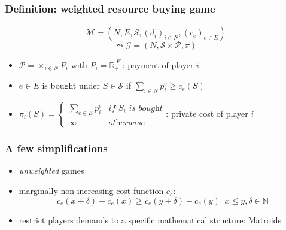 \documentclass{beamer}
\newcommand{\tupel}[1]{\left(#1\right)}
\begin{document}
\begin{frame}
  \frametitle{Definition: weighted resource buying game}
  \begin{equation*}
    \mathcal{M} = \tupel{N, E, \mathcal{S}, \left(d_{i}\right)_{i\in N},
    \left(c_{e}\right)_{e\in E}}
  \end{equation*}
  \begin{equation*}
    \leadsto\mathcal{G} = \tupel{N, \mathcal{S}\times\mathcal{P}, \pi}
  \end{equation*}
  \vspace{-1cm}
  \begin{itemize}
    \item<2-> $\mathcal{P}=\times_{i\in N} P_{i}$ with
      $P_{i} = \mathbb{R}^{|E|}_{+}$: payment of player $i$
    \item<3-> $e\in E$ is bought under $S\in \mathcal{S}$ if
      $\sum_{i\in N}p_{i}^{e} \geq c_{e}(S)$
    \item<4-> $\pi_{i}(S) =
      \begin{cases}
        \sum_{e\in E}p_{i}^{e} &\textit{if }S_{i}\textit{ is bought}\\
        \infty &\textit{otherwise}
      \end{cases}$: {private cost of player $i$}
  \end{itemize}
\end{frame}

\begin{frame}
  \frametitle{A few simplifications}
  \begin{itemize}
    \item \emph{unweighted} games
    \item<2-> marginally non-increasing cost-function $c_{e}$:
      \begin{equation*}
        c_{e}(x + \delta) - c_{e}(x) \geq c_{e}(y + \delta) - c_{e}(y)
        \;\;x\leq y, \delta \in \mathbb{N}
      \end{equation*}
      \begin{center}
      \end{center}
    \item<3-> restrict players demands to a specific mathematical structure:
      Matroids
  \end{itemize}
\end{frame}
\end{document}

